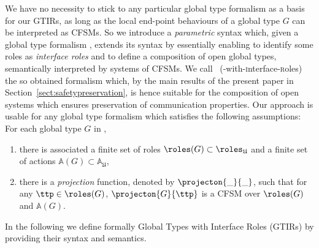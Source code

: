 We have no necessity to stick to any particular global type formalism as a basis for our GTIRs,
as long as the local end-point behaviours of a global type $G$ can be interpreted as CFSMs.
So we introduce a {\em parametric} syntax which, given a global type formalism \gt,
extends its syntax by essentially
enabling to identify some roles as {\em interface roles} and to 
define a  composition of open global types, semantically interpreted by systems of CFSMs.
We call \gtir\ (\gt-with-\textsc{i}nterface-\textsc{r}oles) the so obtained formalism which, 
by the main results of the present paper in Section~\ref{sect:safetypreservation}, is hence suitable for the composition of open systems which ensures preservation of communication properties.
Our approach is  usable for any global type formalism
\gt which satisfies the following assumptions: For each global type $G$ in \gt,

\begin{enumerate}
\item
there is associated a finite set of roles $\roles(G) \subset \roles_\mathfrak{U}$ and a finite set of actions
 $\mathbb{A}(G) \subset \mathbb{A}_\mathfrak{U}$,
 \item
 there is a {\em projection} function, denoted by $\projecton{\_}{\_}$,
 such that for any $\ttp\in\roles(G)$, $\projecton{G}{\ttp}$ is a CFSM
 over $\roles(G)$ and $\mathbb{A}(G)$.
\end{enumerate}

%
%

In the following we define formally
Global Types  with Interface Roles (GTIRs)
by providing their syntax and semantics.

